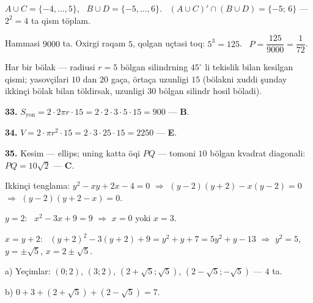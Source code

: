 $A\cup C=\{-4,\dots,5\}$, \ $B\cup D=\{-5,\dots,6\}$. \ $(A\cup C)'\cap(B\cup D)=\{-5;\,6\}$ — $2^2=4$ ta qism töplam.

Hammasi $9000$ ta. Oxirgi raqam $5$, qolgan uçtasi toq: $5^3=125$. \ $P=\dfrac{125}{9000}=\dfrac1{72}$.

\newpage
{}
Har bir bölak — radiusi $r=5$ bölgan silindrning $45^\circ$ li tekislik bilan kesilgan qismi; yasovçilari $10$ dan $20$ gaça, örtaça uzunligi $15$ (bölakni xuddi şunday ikkinçi bölak bilan töldirsak, uzunligi $30$ bölgan silindr hosil böladi).

\textbf{33.} $S_{\text{yon}}=2\cdot2\pi r\cdot15=2\cdot2\cdot3\cdot5\cdot15=900$ — \textbf{B}.

\textbf{34.} $V=2\cdot\pi r^2\cdot15=2\cdot3\cdot25\cdot15=2250$ — \textbf{E}.

\textbf{35.} Kesim — ellips; uning katta öqi $PQ$ — tomoni $10$ bölgan kvadrat diagonali: $PQ=10\sqrt2$ — \textbf{C}.

\newpage
{}
Ikkinçi tenglama: $y^2-xy+2x-4=0$ $\Rightarrow$ $(y-2)(y+2)-x(y-2)=0$ $\Rightarrow$ $(y-2)(y+2-x)=0$.

$y=2$: \ $x^2-3x+9=9$ $\Rightarrow$ $x=0$ yoki $x=3$.

$x=y+2$: \ $(y+2)^2-3(y+2)+9=y^2+y+7=5y^2+y-13$ $\Rightarrow$ $y^2=5$, \ $y=\pm\sqrt5$, $x=2\pm\sqrt5$.

a) Yeçimlar: $(0;2)$, $(3;2)$, $\left(2+\sqrt5;\sqrt5\right)$, $\left(2-\sqrt5;-\sqrt5\right)$ — $4$ ta.

b) $0+3+\left(2+\sqrt5\right)+\left(2-\sqrt5\right)=7$.

